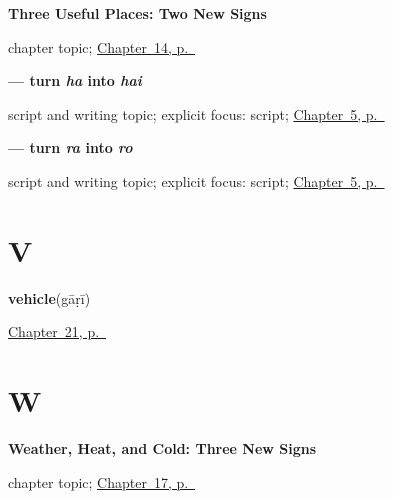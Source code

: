 \noindent\begin{minipage}[t]{\linewidth}
\raggedright
\textbf{Three Useful Places: Two New Signs}\par
\footnotesize chapter topic; \hyperref[ch:mw-places-three]{Chapter~14, p.~\pageref*{ch:mw-places-three}}
\end{minipage}\par\smallskip

\noindent\begin{minipage}[t]{\linewidth}
\raggedright
\textbf{ — turn \emph{ha} into \emph{hai}}\par
\footnotesize script and writing topic; explicit focus: script; \hyperref[ch:mw-name-answer]{Chapter~5, p.~\pageref*{ch:mw-name-answer}}
\end{minipage}\par\smallskip

\noindent\begin{minipage}[t]{\linewidth}
\raggedright
\textbf{ — turn \emph{ra} into \emph{ro}}\par
\footnotesize script and writing topic; explicit focus: script; \hyperref[ch:mw-name-answer]{Chapter~5, p.~\pageref*{ch:mw-name-answer}}
\end{minipage}\par\smallskip

\section*{V}

\noindent\begin{minipage}[t]{\linewidth}
\raggedright
\textbf{vehicle}\enspace\emph{}\enspace(gāṛī)\par
\footnotesize \hyperref[ch:mw-transport-three]{Chapter~21, p.~\pageref*{ch:mw-transport-three}}
\end{minipage}\par\smallskip

\section*{W}

\noindent\begin{minipage}[t]{\linewidth}
\raggedright
\textbf{Weather, Heat, and Cold: Three New Signs}\par
\footnotesize chapter topic; \hyperref[ch:mw-weather-six]{Chapter~17, p.~\pageref*{ch:mw-weather-six}}
\end{minipage}\par\smallskip

